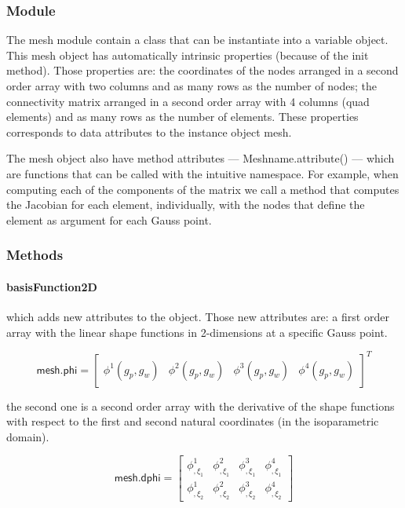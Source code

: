 \documentclass[10pt, a4paper]{article}
\begin{document}
\subsubsection{Module}

The mesh module contain a class that can be instantiate into a variable object. This mesh object has automatically intrinsic properties (because of the init method). Those properties are: the coordinates of the nodes arranged in a second order array with two columns and as many rows as the number of nodes; the connectivity matrix arranged in a second order array with 4 columns (quad elements) and as many rows as the number of elements. These properties corresponds to data attributes to the instance object mesh.

The mesh object also have method attributes ---\textsf{ Meshname.attribute() }--- which are functions that can be called with the intuitive namespace. For example, when computing each of the components of the matrix we call a method that computes the Jacobian for each element, individually, with the nodes that define the element as argument for each Gauss point.


\subsubsection{Methods}

\paragraph{\textsf{basisFunction2D}} which adds new attributes to the object. Those new attributes are: a first order array with the linear shape functions in 2-dimensions at a specific Gauss point.

\begin{equation*}
\textsf{mesh.phi} = \begin{bmatrix}
\phi^1(g_p, g_w) & \phi^2(g_p, g_w) & \phi^3(g_p, g_w) & \phi^4(g_p, g_w)
\end{bmatrix}^T
\end{equation*}

the second one is a second order array with the derivative of the shape functions with respect to the first and second natural coordinates (in the isoparametric domain).

\begin{equation*}
\textsf{mesh.dphi} = \begin{bmatrix}
\phi^1_{,\xi_1} & \phi^2_{,\xi_1} & \phi^3_{,\xi_1} & \phi^4_{,\xi_1}\\[.2cm]
\phi^1_{,\xi_2} & \phi^2_{,\xi_2} & \phi^3_{,\xi_2} & \phi^4_{,\xi_2}
\end{bmatrix}
\end{equation*}
\end{document}
